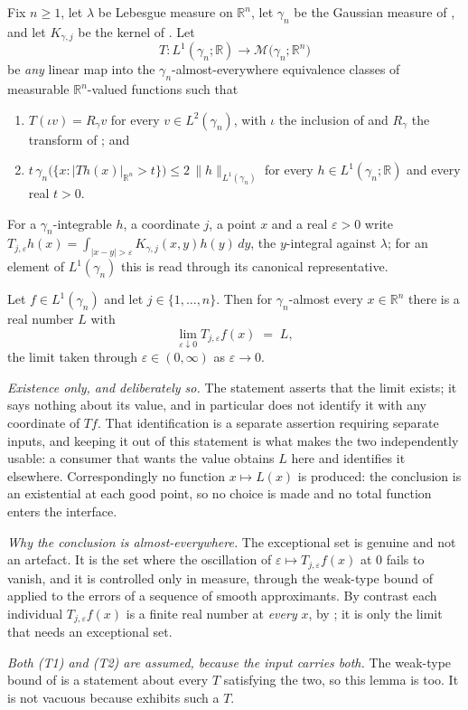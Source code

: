 \begin{lemma}
Fix $n \geq 1$, let $\lambda$ be Lebesgue measure on $\mathbb{R}^n$, let
$\gamma_n$ be the Gaussian measure of , and let
$K_{\gamma,j}$ be the kernel of .  Let
\[
  T : L^1(\gamma_n;\mathbb{R}) \longrightarrow
      \mathcal{M}\bigl(\gamma_n;\mathbb{R}^n\bigr)
\]
be \emph{any} linear map into the $\gamma_n$-almost-everywhere equivalence
classes of measurable $\mathbb{R}^n$-valued functions such that
\begin{enumerate}
\item[(T1)] $T(\iota v) = R_\gamma v$ for every $v \in L^2(\gamma_n)$, with
$\iota$ the inclusion of  and $R_\gamma$ the transform of
; and
\item[(T2)] $t\,\gamma_n\bigl(\{x : |Th(x)|_{\mathbb{R}^n} > t\}\bigr)
\leq 2\,\|h\|_{L^1(\gamma_n)}$ for every $h \in L^1(\gamma_n;\mathbb{R})$ and
every real $t > 0$.
\end{enumerate}
For a $\gamma_n$-integrable $h$, a coordinate $j$, a point $x$ and a real
$\varepsilon > 0$ write
$T_{j,\varepsilon}h(x) = \int_{|x-y|>\varepsilon}K_{\gamma,j}(x,y)h(y)\,dy$,
the $y$-integral against $\lambda$; for an element of $L^1(\gamma_n)$ this is
read through its canonical representative.

Let $f \in L^1(\gamma_n)$ and let $j \in \{1,\ldots,n\}$.  Then for
$\gamma_n$-almost every $x \in \mathbb{R}^n$ there is a real number $L$ with
\[
  \lim_{\varepsilon\downarrow0}T_{j,\varepsilon}f(x) \;=\; L ,
\]
the limit taken through $\varepsilon \in (0,\infty)$ as $\varepsilon \to 0$.

\emph{Existence only, and deliberately so.}  The statement asserts that the
limit exists; it says nothing about its value, and in particular does not
identify it with any coordinate of $Tf$.  That identification is a separate
assertion requiring separate inputs, and keeping it out of this statement is
what makes the two independently usable: a consumer that wants the value
obtains $L$ here and identifies it elsewhere.  Correspondingly no function
$x \mapsto L(x)$ is produced: the conclusion is an existential at each good
point, so no choice is made and no total function enters the interface.

\emph{Why the conclusion is almost-everywhere.}  The exceptional set is
genuine and not an artefact.  It is the set where the oscillation of
$\varepsilon \mapsto T_{j,\varepsilon}f(x)$ at $0$ fails to vanish, and it is
controlled only in measure, through the weak-type bound of
 applied to the errors of a sequence of
smooth approximants.  By contrast each individual $T_{j,\varepsilon}f(x)$ is a
finite real number at \emph{every} $x$, by ;
it is only the limit that needs an exceptional set.

\emph{Both (T1) and (T2) are assumed, because the input carries both.}  The
weak-type bound of  is a statement about
every $T$ satisfying the two, so this lemma is too.  It is not vacuous because
 exhibits such a $T$.
\end{lemma}
